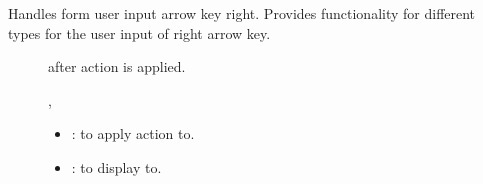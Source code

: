 \documentclass[letterpaper,10pt,english]{sphinxmanual}
\begin{document}
\begin{fulllineitems}
\begin{fulllineitems}
\begin{description}
\end{description}


\end{fulllineitems}


\begin{fulllineitems}
\label{\detokenize{index:_CPPv2N7ostendo10RightArrowE3Var6Window}}%
\pysigstartmultiline
{}\label{\detokenize{index:Pessumnamespaceostendo_1a9306123175f6b620de11b774fbfb5ec5}}%
\pysigstopmultiline
Handles form user input arrow key right. Provides functionality for different {\hyperref[\detokenize{index:Pessumstructostendo_1_1Var}]{}} types for the user input of right arrow key. \begin{description}
\item[{}] \leavevmode
{\hyperref[\detokenize{index:Pessumstructostendo_1_1Var}]{}} after action is applied. 

\item[{}] \leavevmode
{\hyperref[\detokenize{index:Pessumstructostendo_1_1Var}]{}}, {\hyperref[\detokenize{index:Pessumclassostendo_1_1Window}]{}} 

\item[{}] \leavevmode\begin{itemize}
\item {} 
: {\hyperref[\detokenize{index:Pessumstructostendo_1_1Var}]{}} to apply action to. 

\item {} 
: {\hyperref[\detokenize{index:Pessumclassostendo_1_1Window}]{}} to display to. 

\end{itemize}

\end{description}



\end{fulllineitems}
\end{fulllineitems}
\end{document}
